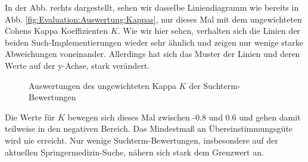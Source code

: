 \begin{minipage}{0.4\linewidth}
In der Abb. rechts dargestellt, sehen wir dasselbe Liniendiagramm wie bereits in Abb. \ref{fig:Evaluation:Auswertung:Kappas}, nur dieses Mal mit dem ungewichteten Cohens Kappa Koeffizienten $K$. Wie wir hier sehen, verhalten sich die Linien der beiden Such-Implementierungen wieder sehr ähnlich und zeigen nur wenige starke Abweichungen voneinander. Allerdings hat sich das Muster der Linien und deren Werte auf der y-Achse, stark verändert. 
\end{minipage}
\hfill
\begin{minipage}{0.55\linewidth}
\begin{figure}[H]
\centering 
\vspace{-2.5em}
\caption[Auswertungen des ungewichteten Kappa $K$ der Suchterm-Bewertungen]{Auswertungen des ungewichteten Kappa $K$ der Suchterm-Bewertungen} 
\label{fig:Evaluation:Auswertung:KappasUnweighted}

\footnotesize
{}\kappas
\pgfsetplotmarksize{.5pt}
  

\vspace{-1em}
\end{figure}
\end{minipage}

Die Werte für $K$ bewegen sich dieses Mal zwischen -0.8 und 0.6 und gehen damit teilweise in den negativen Bereich. Das Mindestmaß an Übereinstimmungsgüte wird nie erreicht. Nur wenige Suchterm-Bewertungen, insbesondere auf der aktuellen Springermedizin-Suche, nähern sich stark dem Grenzwert an. 